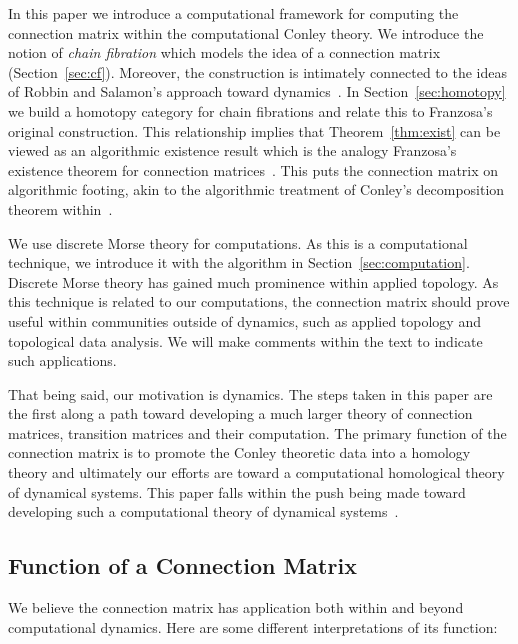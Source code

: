 In this paper we introduce a computational framework for computing the connection matrix within the computational Conley theory.  We introduce the notion of {\em chain fibration} which models the idea of a connection matrix (Section~\ref{sec:cf}).  Moreover, the construction is intimately connected to the ideas of Robbin and Salamon's approach toward dynamics~\cite{salamon}.  In Section~\ref{sec:homotopy} we build a homotopy category for chain fibrations and relate this to Franzosa's original construction.  This relationship implies that Theorem~\ref{thm:exist} can be viewed as an algorithmic existence result which is the analogy Franzosa's existence theorem for connection matrices~\cite[Theorem 3.8]{fran}.   This puts the connection matrix on algorithmic footing, akin to the algorithmic treatment of Conley's decomposition theorem within~\cite{kmv}.

We use discrete Morse theory for computations.  As this is a computational technique, we introduce it with the algorithm in Section~\ref{sec:computation}.  Discrete Morse theory has gained much prominence within applied topology.  As this technique is related to our computations, the connection matrix should prove useful within communities outside of dynamics, such as applied topology and topological data analysis.  We will make comments within the text to indicate such applications.

 That being said, our motivation is dynamics.  The steps taken in this paper are the first along a path toward developing a much larger theory of connection matrices, transition matrices and their computation.  The primary function of the connection matrix is to promote the Conley theoretic data into a homology theory and ultimately our efforts are toward a computational homological theory of dynamical systems.  This paper falls within the push being made toward developing such a computational theory of dynamical systems~\cite{cmdbProject,dsgrnProject}.  

\subsection{Function of a Connection Matrix}

We believe the connection matrix has application both within and beyond computational dynamics.  Here are some different interpretations of its function:

